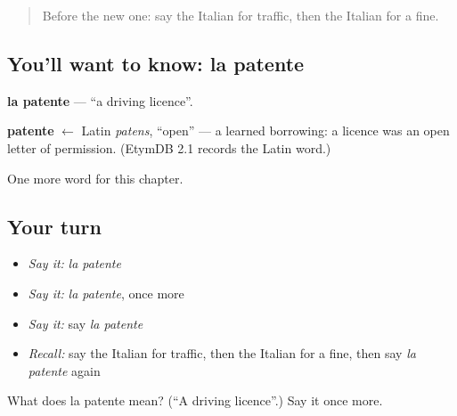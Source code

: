 \begin{quote}
Before the new one: say the Italian for traffic, then the Italian for a fine.
\end{quote}

\subsection*{You'll want to know: la patente}
\textbf{la patente} — \textquotedblleft{}a driving licence\textquotedblright{}.

\begin{cousinweb}
\textbf{patente} $\leftarrow$ Latin \emph{patens}, \textquotedblleft{}open\textquotedblright{} — a learned borrowing: a licence was an open letter of permission. (EtymDB 2.1 records the Latin word.)
\end{cousinweb}

\begin{grammarlens}[title={What you've built}]
One more word for this chapter.
\end{grammarlens}

\subsection*{Your turn}
\begin{itemize}
\raggedright
  \item \emph{Say it:} \emph{la patente}
  \item \emph{Say it:} \emph{la patente}, once more
  \item \emph{Say it:} say \emph{la patente}
  \item \emph{Recall:} say the Italian for traffic, then the Italian for a fine, then say \emph{la patente} again
\end{itemize}

\begin{tcolorbox}[breakable,colback=teal!4,colframe=teal!35!black,title={Before you move on}]
What does la patente mean? (\textquotedblleft{}A driving licence\textquotedblright{}.) Say it once more.
\end{tcolorbox}
